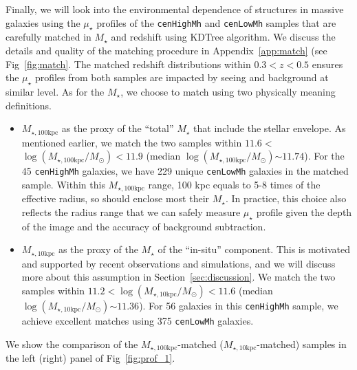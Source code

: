 \documentclass[a4paper,fleqn,usenatbib]{mnras}
\def\rbcg{\texttt{cenHighMh}}
\def\nbcg{\texttt{cenLowMh}}
\def\mstar{{$M_{\star}$}}
\def\minn{{$M_{\star,10\mathrm{kpc}}$}}
\def\mtot{{$M_{\star,100\mathrm{kpc}}$}}
\def\logminn{{$\log (M_{\star,10\mathrm{kpc}}/M_{\odot})$}}
\def\logmtot{{$\log (M_{\star,100\mathrm{kpc}}/M_{\odot})$}}
\def\mden{{$\mu_{\star}$}}
\begin{document}
    Finally, we will look into the environmental dependence of structures in massive 
    galaxies using the \mden{} profiles of the \rbcg{} and \nbcg{} samples that are 
    carefully matched in \mstar{} and redshift using KDTree algorithm. 
    We discuss the details and quality of the matching procedure in 
    Appendix~\ref{app:match} (see Fig~\ref{fig:match}. 
    The matched redshift distributions within $0.3 < z < 0.5$ ensures the \mden{} 
    profiles from both samples are impacted by seeing and background at similar level. 
    As for the \mstar{}, we choose to match using two physically meaning definitions.
    
    \begin{itemize}
        \item \mtot{} as the proxy of the ``total'' \mstar{} that include the stellar 
            envelope.  As mentioned earlier, we match the two samples within 
            $11.6 < $\logmtot{}$<11.9$ (median \logmtot{}$\sim 11.74$).
            For the 45 \rbcg{} galaxies, we have 229 unique \nbcg{} galaxies in the 
            matched sample.
            Within this \mtot{} range, 100 kpc equals to 5-8 times of the effective 
            radius, so should enclose most their \mstar{}. 
            In practice, this choice also reflects the radius range that we can safely 
            measure \mden{} profile given the depth of the image and the accuracy of 
            background subtraction.
        
        \item \minn{} as the proxy of the \mstar{} of the ``in-situ'' component.
            This is motivated and supported by recent observations and simulations, 
            and we will discuss more about this assumption in 
            Section~\ref{sec:discussion}.
            We match the two samples within $11.2 < $\logminn{}$ < 11.6$ 
            (median \logminn{}$\sim 11.36$).
            For 56 galaxies in this \rbcg{} sample, we achieve excellent matches
            using 375 \nbcg{} galaxies.
    \end{itemize}
    
    We show the comparison of the \mtot{}-matched (\minn{}-matched) samples in the 
    left (right) panel of Fig~\ref{fig:prof_1}. 
\end{document}
